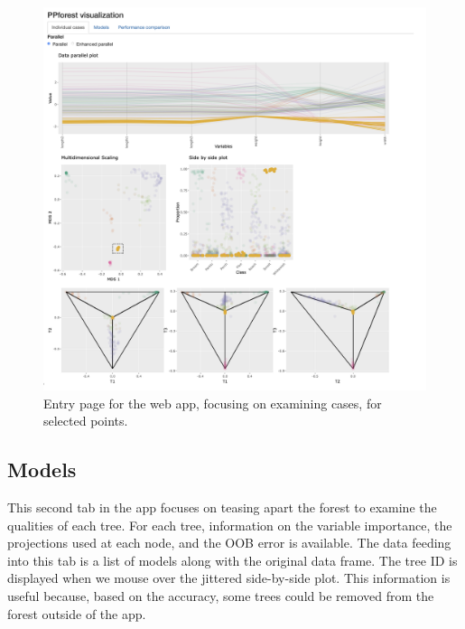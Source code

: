 \documentclass[smallextended,natbib]{svjour3}\usepackage[]{graphicx}\usepackage[]{xcolor}
\begin{document}
\begin{figure}[hbpt]
\centering
\includegraphics[width=1\linewidth]{tab1com2.png}
\caption{Entry page for the web app, focusing on examining cases, for selected points.  \label{tab1comp}}
\end{figure}

\subsection{Models}

This second tab in the app focuses on teasing apart the forest to examine the qualities of each tree. For each tree, information on the variable importance, the projections used at each node, and the OOB error is available. The data feeding into this tab is a list of models along with the original data frame.
The tree ID is displayed when we mouse over the jittered side-by-side plot. This information is useful because, based on the accuracy, some trees could be removed from the forest outside of the app.
\end{document}
